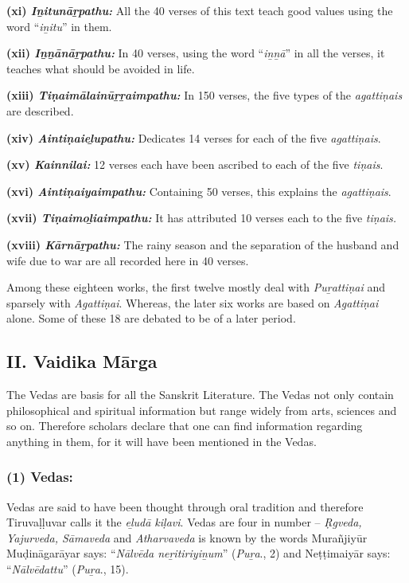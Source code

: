 \textbf{(xi) \textit{Iṉitunāṟpathu:}} All the 40 verses of this text teach good values using the word “\textit{iṉitu}” in them.

\textbf{(xii) \textit{Iṉṉānāṟpathu:}} In 40 verses, using the word “\textit{iṉṉā}” in all the verses, it teaches what should be avoided in life.

\textbf{(xiii) \textit{Tiṇaimālainūṟṟaimpathu:}} In 150 verses, the five types of the \textit{agattiṇais} are described.

\textbf{(xiv) \textit{Aintiṇaieḻupathu:}} Dedicates 14 verses for each of the five \textit{agattiṇais}.

\textbf{(xv) \textit{Kainnilai:}} 12 verses each have been ascribed to each of the five \textit{tiṇais}.

\textbf{(xvi) \textit{Aintiṇaiyaimpathu:}} Containing 50 verses, this explains the \textit{agattiṇais}.

\textbf{(xvii) \textit{Tiṇaimoḻiaimpathu:}} It has attributed 10 verses each to the five \textit{tiṇais.}

\textbf{(xviii) \textit{Kārnāṟpathu:}} The rainy season and the separation of the husband and wife due to war are all recorded here in 40 verses.

Among these eighteen works, the first twelve mostly deal with \textit{Puṟattiṇai} and sparsely with \textit{Agattiṇai}. Whereas, the later six works are based on \textit{Agattiṇai} alone. Some of these 18 are debated to be of a later period.


\subsection*{II. Vaidika Mārga}

\vskip -7pt

The Vedas are basis for all the Sanskrit Literature. The Vedas not only contain philosophical and spiritual information but range widely from arts, sciences and so on. Therefore scholars declare that one can find information regarding anything in them, for it will have been mentioned in the Vedas.

\subsubsection*{(1) Vedas:}

\vskip -7pt

Vedas are said to have been thought through oral tradition and therefore Tiruvaḷḷuvar calls it the \textit{eḻudā kiḷavi}. Vedas are four in number – \textit{Ṛgveda, Yajurveda, Sāmaveda} and \textit{Atharvaveda} is known by the words Murañjiyūr Muḍināgarāyar says: “\textit{Nālvēda neṟitiriyiṉum}” (\textit{Puṟa}., 2) and Neṭṭimaiyār says: “\textit{Nālvēdattu}” (\textit{Puṟa}., 15).


